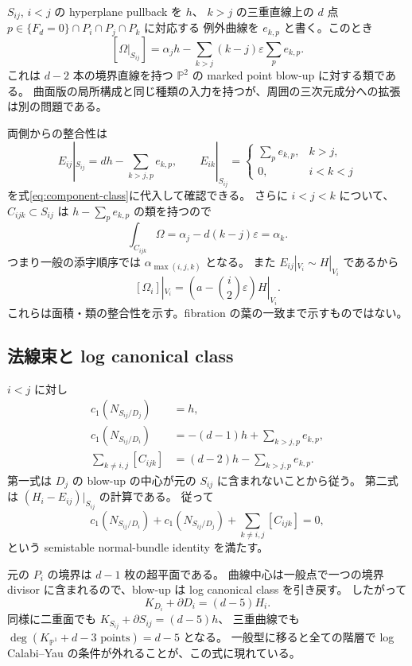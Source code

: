 \documentclass[11pt,a4paper]{article}
\theoremstyle{definition}
\newcommand{\PP}{\mathbb P}
\newcommand{\eps}{\varepsilon}
\begin{document}
$S_{ij}$, $i<j$ の hyperplane pullback を $h$、
$k>j$ の三重直線上の $d$ 点 $p\in\{F_d=0\}\cap P_i\cap P_j\cap P_k$ に対応する
例外曲線を $e_{k,p}$ と書く。このとき
\begin{equation}\label{eq:surface-class}
[\Omega|_{S_{ij}}]=\alpha_jh-
\sum_{k>j}(k-j)\eps\sum_pe_{k,p}.
\end{equation}
これは $d-2$ 本の境界直線を持つ $\PP^2$ の marked point blow-up に対する類である。
曲面版の局所構成と同じ種類の入力を持つが、周囲の三次元成分への拡張は別の問題である。

両側からの整合性は
\[
E_{ij}|_{S_{ij}}=dh-\sum_{k>j,p}e_{k,p},\qquad
E_{ik}|_{S_{ij}}=
\begin{cases}
\sum_pe_{k,p},&k>j,\\
0,&i<k<j
\end{cases}
\]
を式\eqref{eq:component-class}に代入して確認できる。
さらに $i<j<k$ について、$C_{ijk}\subset S_{ij}$ は
$h-\sum_pe_{k,p}$ の類を持つので
\begin{equation}\label{eq:triple-area}
\int_{C_{ijk}}\Omega=\alpha_j-d(k-j)\eps=\alpha_k.
\end{equation}
つまり一般の添字順序では $\alpha_{\max(i,j,k)}$ となる。
また $E_{ij}|_{V_i}\sim H|_{V_i}$ であるから
\begin{equation}\label{eq:V-class}
[\Omega_i]|_{V_i}=\left(a-\binom i2\eps\right)H|_{V_i}.
\end{equation}
これらは面積・類の整合性を示す。fibration の葉の一致まで示すものではない。

\subsection{法線束と log canonical class}

$i<j$ に対し
\begin{align}
c_1(N_{S_{ij}/D_j})&=h,\label{eq:normal-j}\\
c_1(N_{S_{ij}/D_i})&=-(d-1)h+\sum_{k>j,p}e_{k,p},\label{eq:normal-i}\\
\sum_{k\ne i,j}[C_{ijk}]&=(d-2)h-\sum_{k>j,p}e_{k,p}.
\end{align}
第一式は $D_j$ の blow-up の中心が元の $S_{ij}$ に含まれないことから従う。
第二式は $(H_i-E_{ij})|_{S_{ij}}$ の計算である。
従って
\[
c_1(N_{S_{ij}/D_i})+c_1(N_{S_{ij}/D_j})+
\sum_{k\ne i,j}[C_{ijk}]=0,
\]
という semistable normal-bundle identity を満たす。

元の $P_i$ の境界は $d-1$ 枚の超平面である。
曲線中心は一般点で一つの境界 divisor に含まれるので、blow-up は log canonical class を引き戻す。
したがって
\begin{equation}\label{eq:logK}
K_{D_i}+\partial D_i=(d-5)H_i.
\end{equation}
同様に二重面でも $K_{S_{ij}}+\partial S_{ij}=(d-5)h$、
三重曲線でも $\deg(K_{\PP^1}+\text{$d-3$ points})=d-5$ となる。
一般型に移ると全ての階層で log Calabi--Yau の条件が外れることが、この式に現れている。
\end{document}
